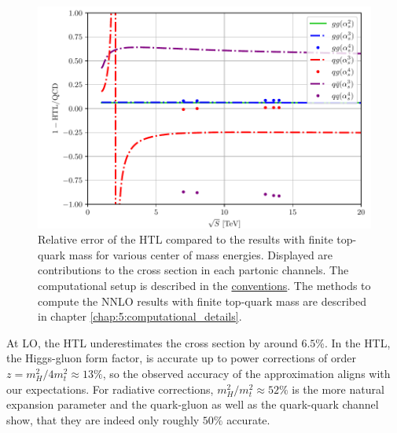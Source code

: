 \begin{figure}[h]
\centering
\includegraphics[width=\figurewidth]{Images/HTL_accuracy.pdf}
\caption{Relative error of the \acs{HTL} compared to the results with finite top-quark mass for various center of mass energies. Displayed are contributions to the cross section in each partonic channels. The computational setup is described in the \hyperref[chap:notation_and_conventions]{conventions}. The methods to compute the \acs{NNLO} results with finite top-quark mass are described in chapter \ref{chap:5:computational_details}.}
\label{fig:4:HTL_accuracy}
\end{figure}
At \acs{LO}, the \acs{HTL} underestimates the cross section by around $6.5$\%. In the \acs{HTL}, the Higgs-gluon form factor, is accurate up to power corrections of order $z = m_H^2/4m_t^2 \approx 13\%$, so the observed accuracy of the approximation aligns with our expectations. For radiative corrections, $m_H^2/m_t^2 \approx 52\%$ is the more natural expansion parameter and the quark-gluon as well as the quark-quark channel show, that they are indeed only roughly $50\%$ accurate.

